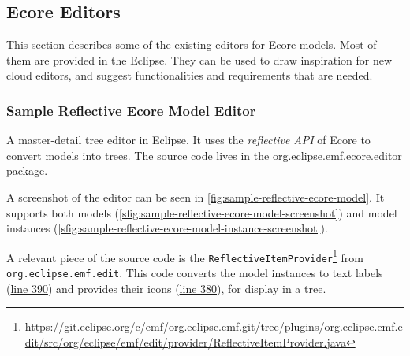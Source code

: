 \subsection{Ecore Editors}

This section describes some of the existing editors for \gls{Ecore} models.
Most of them are provided in the \gls{Eclipse}.
They can be used to draw inspiration for new \gls{cloud} editors, and suggest functionalities and requirements that are needed.

\subsubsection{Sample Reflective Ecore Model Editor} %
A master-detail tree editor in \gls{Eclipse}.
It uses the \emph{reflective \acrshort{API}} of \gls{Ecore} to convert models into trees.
The source code lives in the \href{https://git.eclipse.org/c/emf/org.eclipse.emf.git/tree/plugins/org.eclipse.emf.ecore.editor/src/org/eclipse/emf/ecore/presentation/EcoreEditor.java}{org.eclipse.emf.ecore.editor} package.

A screenshot of the editor can be seen in \cref{fig:sample-reflective-ecore-model}.
It supports both models (\cref{sfig:sample-reflective-ecore-model-screenshot}) and model instances (\cref{sfig:sample-reflective-ecore-model-instance-screenshot}).

A relevant piece of the source code is the \texttt{ReflectiveItemProvider}\footnote{\href{https://git.eclipse.org/c/emf/org.eclipse.emf.git/tree/plugins/org.eclipse.emf.edit/src/org/eclipse/emf/edit/provider/ReflectiveItemProvider.java}{https://git.eclipse.org/c/emf/org.eclipse.emf.git/tree/plugins/org.eclipse.emf.edit/src/org/eclipse/emf/edit/provider/ReflectiveItemProvider.java}} from \texttt{org.eclipse.emf.edit}.
This code converts the model instances to text labels (\href{https://git.eclipse.org/c/emf/org.eclipse.emf.git/tree/plugins/org.eclipse.emf.edit/src/org/eclipse/emf/edit/provider/ReflectiveItemProvider.java#n390}{line 390}) and provides their icons (\href{https://git.eclipse.org/c/emf/org.eclipse.emf.git/tree/plugins/org.eclipse.emf.edit/src/org/eclipse/emf/edit/provider/ReflectiveItemProvider.java#n380}{line 380}), for display in a tree.

